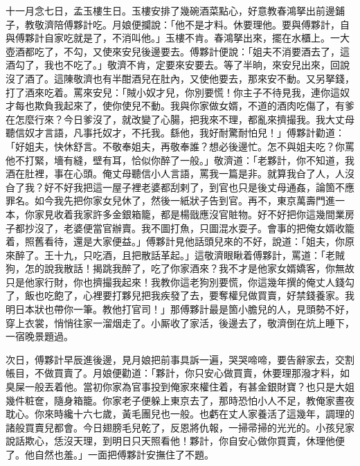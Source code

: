 十一月念七日，孟玉樓生日。玉樓安排了幾碗酒菜點心，好意教春鴻拏出前邊鋪子，教敬濟陪傅夥計吃。月娘便攔說：「他不是才料。休要理他。{}要與傅夥計，自與傅夥計自家吃就是了，不消叫他。」玉樓不肯。{}春鴻拏出來，擺在水櫃上。一大壺酒都吃了，不勾，又使來安兒後邊要去。傅夥計便說：「姐夫不消要酒去了，這酒勾了，我也不吃了。」敬濟不肯，定要來安要去。等了半晌，來安兒出來，回說沒了酒了。這陳敬濟也有半酣酒兒在肚內，又使他要去，那來安不動。又另拏錢，打了酒來吃着。罵來安兒：「賊小奴才兒，你別要慌！你主子不待見我，連你這奴才每也欺負我起來了，使你使兒不動。我與你家做女婿，不道的酒肉吃傷了，有爹在怎麼行來？今日爹沒了，就改變了心腸，把我來不理，都亂來擠撮我。我大丈母聽信奴才言語，凡事托奴才，不托我。繇他，我好耐驚耐怕兒！」傅夥計勸道：「好姐夫，快休舒言。不敬奉姐夫，再敬奉誰？想必後邊忙。怎不與姐夫吃？你罵他不打緊，墻有縫，壁有耳，恰似你醉了一般。」敬濟道：「老夥計，你不知道，我酒在肚裡，事在心頭。俺丈母聽信小人言語，罵我一篇是非。就算我㒲了人，人沒㒲了我？好不好我把這一屋子裡老婆都刮剌了，到官也只是後丈母通姦，論箇不應罪名。如今我先把你家女兒休了，然後一紙狀子告到官。再不，東京萬壽門進一本，你家見收着我家許多金銀箱籠，都是楊戩應沒官賍物。好不好把你這幾間業房子都抄沒了，老婆便當官辦賣。我不圖打魚，只圖混水耍子。{}會事的把俺女婿收籠着，照舊看待，還是大家便益。」傅夥計見他話頭兒來的不好，說道：「姐夫，你原來醉了。王十九，只吃酒，且把散話革起。」這敬濟眼瞅着傅夥計，罵道：「老賊狗，怎的說我散話！揭跳我醉了，吃了你家酒來？我不才是他家女婿嬌客，你無故只是他家行財，你也擠撮我起來！我教你這老狗別要慌，你這幾年撰的俺丈人錢勾了，飯也吃飽了，心裡要打夥兒把我疾發了去，要奪權兒做買賣，好禁錢養家。{}我明日本狀也帶你一筆。教他打官司！」{}那傅夥計最是箇小膽兒的人，見頭勢不好，穿上衣裳，悄悄往家一溜烟走了。小厮收了家活，後邊去了，敬濟倒在炕上睡下，一宿晚景題過。

次日，傅夥計早辰進後邊，見月娘把前事具訴一遍，哭哭啼啼，要告辭家去，交割帳目，不做買賣了。月娘便勸道：「夥計，你只安心做買賣，休要理那潑才料，如臭屎一般丟着他。當初你家為官事投到俺家來權住着，{}有甚金銀財寶？也只是大姐幾件粧奩，隨身箱籠。你家老子便躲上東京去了，那時恐怕小人不足，教俺家晝夜耽心。你來時纔十六七歲，黃毛團兒也一般。也虧在丈人家養活了這幾年，調理的諸般買賣兒都會。今日翅膀毛兒乾了，反恩將仇報，一掃帚掃的光光的。小孩兒家說話欺心，恁沒天理，到明日只天照看他！夥計，你自安心做你買賣，休理他便了。他自然也羞。」一面把傅夥計安撫住了不題。

